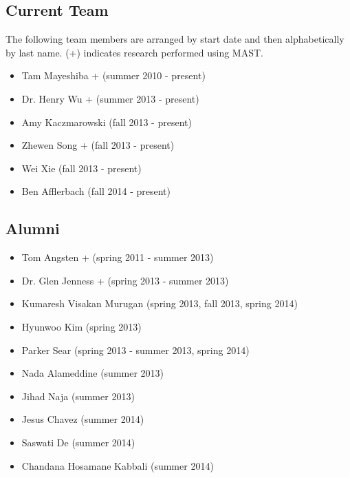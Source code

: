\documentclass[letterpaper,10pt,english]{sphinxmanual}
\begin{document}
\subsection{Current Team}
\label{10_0_acknowledgments:current-team}
The following team members are arranged by start date and then alphabetically by last name. (+) indicates research performed using MAST.
\begin{itemize}
\item {} 
Tam Mayeshiba + (summer 2010 - present)

\item {} 
Dr. Henry Wu + (summer 2013 - present)

\item {} 
Amy Kaczmarowski (fall 2013 - present)

\item {} 
Zhewen Song + (fall 2013 - present)

\item {} 
Wei Xie (fall 2013 - present)

\item {} 
Ben Afflerbach (fall 2014 - present)

\end{itemize}


\subsection{Alumni}
\label{10_0_acknowledgments:alumni}\begin{itemize}
\item {} 
Tom Angsten + (spring 2011 - summer 2013)

\item {} 
Dr. Glen Jenness + (spring 2013 - summer 2013)

\item {} 
Kumaresh Visakan Murugan (spring 2013, fall 2013, spring 2014)

\item {} 
Hyunwoo Kim (spring 2013)

\item {} 
Parker Sear (spring 2013 - summer 2013, spring 2014)

\item {} 
Nada Alameddine (summer 2013)

\item {} 
Jihad Naja (summer 2013)

\item {} 
Jesus Chavez (summer 2014)

\item {} 
Saswati De (summer 2014)

\item {} 
Chandana Hosamane Kabbali (summer 2014)

\end{itemize}
\end{document}
